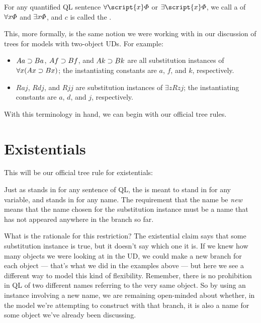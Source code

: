 For any quantified QL sentence $\forall \script{x} \metaA{}$ or $\exists \script{x} \metaA{}$, we call \metaA{} a  of $\forall x\varPhi{}$ and $\exists x\varPhi{}$, and $c$ is called the .

This, more formally, is the same notion we were working with in our discussion of trees for models with two-object UDs. For example:

\begin{itemize}
\item $Aa \supset Ba$, $Af \supset Bf$, and $Ak \supset Bk$ are all substitution instances of $\forall x(Ax \supset Bx)$; the instantiating constants are $a$, $f$, and $k$, respectively.
\item $Raj$, $Rdj$, and $Rjj$ are substitution instances of $\exists zRzj$; the instantiating constants are $a$, $d$, and $j$, respectively.
\end{itemize}

With this terminology in hand, we can begin with our official tree rules.

\section{Existentials}

This will be our official tree rule for existentials:


Just as \metaA{} stands in for any sentence of QL, the  is meant to stand in for any variable, and  stands in for any name. The requirement that the name be \emph{new} means that the name chosen for the substitution instance must be a name that has not appeared anywhere in the branch so far. 

What is the rationale for this restriction? The existential claim says that some substitution instance is true, but it doesn't say which one it is. If we knew how many objects we were looking at in the UD, we could make a new branch for each object --- that's what we did in the examples above --- but here we see a different way to model this kind of flexibility. Remember, there is no prohibition in QL of two different names referring to the very same object. So by using an instance involving a new name, we are remaining open-minded about whether, in the model we're attempting to construct with that branch, it is also a name for some object we've already been discussing.

